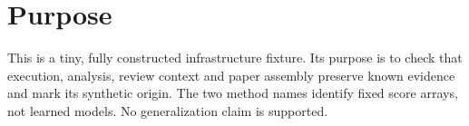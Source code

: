 \section{Purpose}
This is a tiny, fully constructed infrastructure fixture. Its purpose is to
check that execution, analysis, review context and paper assembly preserve
known evidence and mark its synthetic origin. The two method names identify
fixed score arrays, not learned models. No generalization claim is supported.
